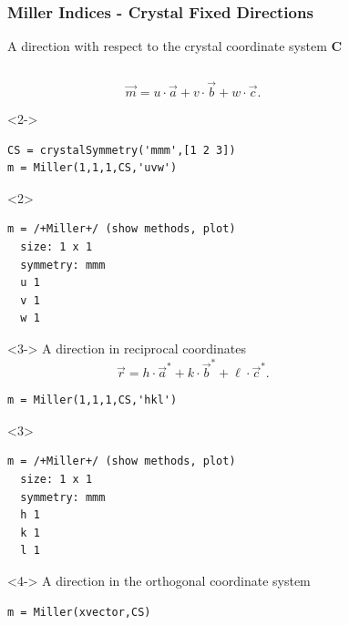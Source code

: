 \documentclass[compress]{beamer}
\begin{document}
\begin{frame}[fragile]
  \frametitle{Miller Indices - Crystal Fixed Directions}

  A direction with respect to the crystal coordinate system  $\mathbf C$

  \begin{columns}
    \begin{column}{7cm}

      \begin{overlayarea}{8cm}{8cm}

        \begin{equation*}
          \vec m = u \cdot \vec a+ v \cdot \vec b + w \cdot \vec c.
        \end{equation*}

    \begin{onlyenv}<2->
\begin{lstlisting}[style=input]
CS = crystalSymmetry('mmm',[1 2 3])
m = Miller(1,1,1,CS,'uvw')
\end{lstlisting}
\end{onlyenv}
\begin{onlyenv}<2>
\vspace{-.3cm}\begin{lstlisting}[style=output]
m = /+Miller+/ (show methods, plot)
  size: 1 x 1
  symmetry: mmm
  u 1
  v 1
  w 1
\end{lstlisting}
\end{onlyenv}

    \begin{onlyenv}<3->
A direction in reciprocal coordinates
\begin{equation*}
  \vec r = h \cdot \vec a^{*}+ k \cdot \vec b^{*} + \ell \cdot \vec c^{*}.
\end{equation*}
\begin{lstlisting}[style=input]
m = Miller(1,1,1,CS,'hkl')
\end{lstlisting}
\end{onlyenv}
\begin{onlyenv}<3>
  \vspace{-.3cm}
  \begin{lstlisting}[style=output]
m = /+Miller+/ (show methods, plot)
  size: 1 x 1
  symmetry: mmm
  h 1
  k 1
  l 1
\end{lstlisting}
\end{onlyenv}

\medskip

\begin{onlyenv}<4->
  A direction in the orthogonal coordinate system
  \begin{lstlisting}[style=input]
m = Miller(xvector,CS)
\end{lstlisting}
\end{onlyenv}
\end{overlayarea}
\end{column}
    \begin{column}{4cm}


\end{column}
\end{columns}
\end{frame}
\end{document}
